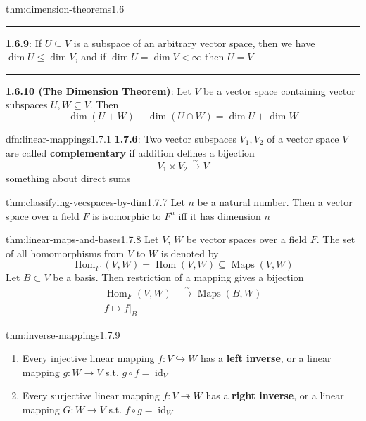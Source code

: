 \documentclass[landscape, 8pt]{extarticle}
\DeclareMathOperator{\Maps}{Maps}
\DeclareMathOperator{\Hom}{Hom}
\DeclareMathOperator{\id}{id}
\begin{document}
\begin{multicols}{3}
\begin{thm}{thm:dimension-theorems}{1.6}
    \noindent\rule{\textwidth}{0.2pt}
    \textbf{1.6.9}: If $U \subseteq V$ is a subspace of an arbitrary vector space, then we have $\dim U \le \dim V$, and if $\dim U = \dim V < \infty$ then $U = V$

    \noindent\rule{\textwidth}{0.2pt}
    \textbf{1.6.10 (The Dimension Theorem)}: Let $V$ be a vector space containing vector subspaces $U,W\subseteq V$. Then
    \[\dim(U + W) + \dim(U \cap W) = \dim U + \dim W\]
\end{thm}

\begin{dfn}{dfn:linear-mappings}{1.7.1}
    \textbf{1.7.6}: Two vector subspaces $V_{1}, V_{2}$ of a vector space $V$ are called \textbf{complementary} if addition defines a bijection
    \[V_{1} \times V_{2} \xrightarrow{\sim} V\]
    something about direct sums
\end{dfn}

\vspace{-5pt}
\begin{thm}{thm:classifying-vecspaces-by-dim}{1.7.7}
    Let $n$ be a natural number. Then a vector space over a field $F$ is isomorphic to $F^{n}$ iff it has dimension $n$
\end{thm}

\vspace{-5pt}
\begin{thm}{thm:linear-maps-and-bases}{1.7.8}
    Let $V$, $W$ be vector spaces over a field $F$. The set of all homomorphisms from $V$ to $W$ is denoted by
    \[\Hom_{F}(V,W) = \Hom(V,W)\subseteq \Maps(V,W)\]
    Let $B \subset V$ be a basis. Then restriction of a mapping gives a bijection
    \begin{align*}
        \Hom_{F}(V, W) &\xrightarrow{\sim} \Maps(B, W) \\
        f \mapsto f \lvert_{B}
    \end{align*}
\end{thm}

\vspace{-5pt}
\begin{thm}{thm:inverse-mappings}{1.7.9}
    \begin{enumerate}[leftmargin=*]
        \setlength\itemsep{0em}
        \item Every injective linear mapping $f : V \hookrightarrow W$ has a \textbf{left inverse}, or a linear mapping $g : W \to V$ s.t. $g \circ f = \id_{V}$
        \item Every surjective linear mapping $f : V \twoheadrightarrow W$ has a \textbf{right inverse}, or a linear mapping $G : W \to V$ s.t. $f \circ g = \id_{W}$
    \end{enumerate}
\end{thm}


\end{multicols}
\end{document}
